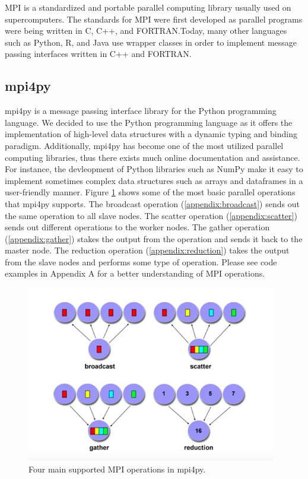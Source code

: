 	MPI is a standardized and portable parallel computing library usually used on supercomputers. The standards for MPI were first developed as parallel programs were being written in C, C++, and FORTRAN.Today, many other languages such as Python, R, and Java use wrapper classes in order to implement message passing interfaces written in C++ and FORTRAN.

\subsection{mpi4py}
	mpi4py is a message passing interface library for the Python programming language. We decided to use the Python programming language as it offers the implementation of high-level data structures with a dynamic typing and binding paradigm. Additionally, mpi4py has become one of the most utilized parallel computing libraries, thus there exists much online documentation and assistance. For instance, the devleopment of Python libraries such as NumPy make it easy to implement sometimes complex data structures such as arrays and dataframes in a user-friendly manner. Figure \ref{fig:MPI Operations} shows some of the most basic parallel operations that mpi4py supports. The broadcast operation (\ref{appendix:broadcast}) sends out the same operation to all slave nodes. The scatter operation (\ref{appendix:scatter}) sends out different operations to the worker nodes. The gather operation (\ref{appendix:gather}) stakes the output from the operation and sends it back to the master node. The reduction operation (\ref{appendix:reduction}) takes the output from the slave nodes and performs some type of operation. Please see code examples in Appendix A for a better understanding of MPI operations.
	
	
\begin{figure}
\centering
\includegraphics{Figures/mpi-diagram}
\decoRule
\caption[MPI Operations]{Four main supported MPI operations in mpi4py.}
\label{fig:MPI Operations}
\end{figure}

